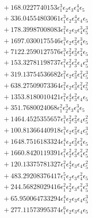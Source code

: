 \documentclass[10pt]{article}
\begin{document}
\begin{align*}
&{}  + 168.0227740153 \epsilon_{1}^{3} \epsilon_{2} \epsilon_{3} \epsilon_{4}^{4} \epsilon_{5} \\
&{}  + 336.04554803061 \epsilon_{1}^{3} \epsilon_{2} \epsilon_{3}^{4} \epsilon_{4} \epsilon_{5} \\
&{}  + 178.39987008083 \epsilon_{1}^{2} \epsilon_{2} \epsilon_{3} \epsilon_{4}^{3} \epsilon_{5}^{3} \\
&{}  + 1697.0300175546 \epsilon_{1}^{3} \epsilon_{2} \epsilon_{3}^{2} \epsilon_{4}^{3} \epsilon_{5} \\
&{}  + 7122.2590127576 \epsilon_{1}^{3} \epsilon_{2}^{2} \epsilon_{3}^{2} \epsilon_{4}^{2} \epsilon_{5} \\
&{}  + 153.32781198737 \epsilon_{1}^{2} \epsilon_{2}^{2} \epsilon_{3}^{2} \epsilon_{4} \epsilon_{5}^{3} \\
&{}  + 319.13754536682 \epsilon_{1}^{2} \epsilon_{2} \epsilon_{3}^{2} \epsilon_{4}^{2} \epsilon_{5}^{3} \\
&{}  + 638.27509073364 \epsilon_{1}^{2} \epsilon_{2} \epsilon_{3}^{3} \epsilon_{4}^{2} \epsilon_{5}^{2} \\
&{}  + 1353.8180010421 \epsilon_{1}^{2} \epsilon_{2}^{4} \epsilon_{3}^{2} \epsilon_{4} \epsilon_{5} \\
&{}  + 351.7680024068 \epsilon_{1}^{2} \epsilon_{2}^{3} \epsilon_{3} \epsilon_{4}^{3} \epsilon_{5} \\
&{}  + 1464.4525355657 \epsilon_{1}^{3} \epsilon_{2}^{2} \epsilon_{3}^{2} \epsilon_{4} \epsilon_{5}^{2} \\
&{}  + 100.81366440918 \epsilon_{1}^{3} \epsilon_{2} \epsilon_{3}^{2} \epsilon_{4} \epsilon_{5}^{3} \\
&{}  + 1648.7516183324 \epsilon_{1}^{4} \epsilon_{2} \epsilon_{3}^{2} \epsilon_{4}^{2} \epsilon_{5} \\
&{}  + 1660.8420119391 \epsilon_{1}^{2} \epsilon_{2}^{2} \epsilon_{3}^{2} \epsilon_{4}^{2} \epsilon_{5}^{2} \\
&{}  + 120.13375781327 \epsilon_{1}^{2} \epsilon_{2}^{4} \epsilon_{3} \epsilon_{4} \epsilon_{5}^{2} \\
&{}  + 483.29208376417 \epsilon_{1}^{5} \epsilon_{2} \epsilon_{3} \epsilon_{4}^{2} \epsilon_{5} \\
&{}  + 244.56828029416 \epsilon_{1}^{2} \epsilon_{2}^{2} \epsilon_{3} \epsilon_{4}^{2} \epsilon_{5}^{3} \\
&{}  + 65.950064733294 \epsilon_{1}^{4} \epsilon_{2} \epsilon_{3} \epsilon_{4} \epsilon_{5}^{3} \\
&{}  + 277.11573995374 \epsilon_{1}^{6} \epsilon_{2} \epsilon_{3} \epsilon_{4} \epsilon_{5} \\

\end{align*}
\end{document}
